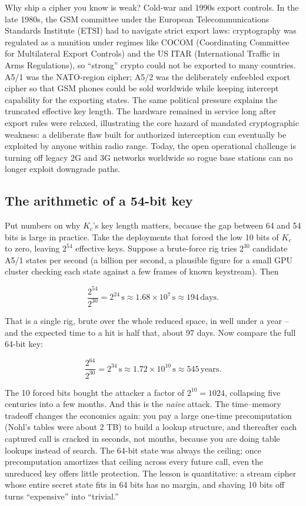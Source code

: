 \begin{historybox}
Why ship a cipher you know is weak? Cold-war and 1990s export controls. In the late 1980s, the GSM committee under the European Telecommunications Standards Institute (ETSI) had to navigate strict export laws: cryptography was regulated as a munition under regimes like COCOM (Coordinating Committee for Multilateral Export Controls) and the US ITAR (International Traffic in Arms Regulations), so ``strong'' crypto could not be exported to many countries. A5/1 was the NATO-region cipher; A5/2 was the deliberately enfeebled export cipher so that GSM phones could be sold worldwide while keeping intercept capability for the exporting states. The same political pressure explains the truncated effective key length. The hardware remained in service long after export rules were relaxed, illustrating the core hazard of mandated cryptographic weakness: a deliberate flaw built for authorized interception can eventually be exploited by anyone within radio range. Today, the open operational challenge is turning off legacy 2G and 3G networks worldwide so rogue base stations can no longer exploit downgrade paths.
\end{historybox}

\subsection{The arithmetic of a 54-bit key}
\label{ch29:a5-numbers}

Put numbers on why $K_c$'s key length matters, because the gap between 64 and 54 bits is large in practice. Take the deployments that forced the low 10 bits of $K_c$ to zero, leaving $2^{54}$ effective keys. Suppose a brute-force rig tries $2^{30}$ candidate A5/1 states per second (a billion per second, a plausible figure for a small GPU cluster checking each state against a few frames of known keystream). Then

\[
  \frac{2^{54}}{2^{30}} = 2^{24}\,\text{s} \approx 1.68\times 10^{7}\,\text{s} \approx 194\,\text{days}.
\]

That is a single rig, brute over the whole reduced space, in well under a year -- and the expected time to a hit is half that, about 97 days. Now compare the full 64-bit key:

\[
  \frac{2^{64}}{2^{30}} = 2^{34}\,\text{s} \approx 1.72\times 10^{10}\,\text{s} \approx 545\,\text{years}.
\]

The 10 forced bits bought the attacker a factor of $2^{10} = 1024$, collapsing five centuries into a few months. And this is the \emph{naive} attack. The time--memory tradeoff changes the economics again: you pay a large one-time precomputation (Nohl's tables were about 2 TB) to build a lookup structure, and thereafter each captured call is cracked in seconds, not months, because you are doing table lookups instead of search. The 64-bit state was always the ceiling; once precomputation amortizes that ceiling across every future call, even the unreduced key offers little protection. The lesson is quantitative: a stream cipher whose entire secret state fits in 64 bits has no margin, and shaving 10 bits off turns ``expensive'' into ``trivial.''

